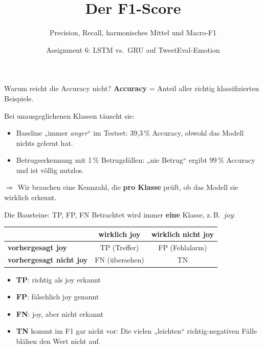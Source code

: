 \documentclass[aspectratio=169,11pt]{beamer}
\title{Der F1-Score}
\subtitle{Precision, Recall, harmonisches Mittel und Macro-F1}
\date{Assignment 6: LSTM vs.\ GRU auf TweetEval-Emotion}
\begin{document}
\maketitle

\begin{frame}{Warum reicht die Accuracy nicht?}
  \textbf{Accuracy} = Anteil aller richtig klassifizierten Beispiele.

  \vspace{1em}
  Bei \alert{unausgeglichenen Klassen} täuscht sie:
  \begin{itemize}
    \item Baseline „immer \emph{anger}“ im Testset: \alert{39{,}3\,\% Accuracy}, obwohl das Modell nichts gelernt hat.
    \item Betrugserkennung mit 1\,\% Betrugsfällen: „nie Betrug“ ergibt \alert{99\,\% Accuracy} und ist völlig nutzlos.
  \end{itemize}

  \vspace{1em}
  \(\Rightarrow\) Wir brauchen eine Kennzahl, die \textbf{pro Klasse} prüft, ob das Modell sie wirklich erkennt.
\end{frame}

\begin{frame}{Die Bausteine: TP, FP, FN}
  Betrachtet wird immer \textbf{eine} Klasse, z.\,B.\ \emph{joy}:

  \vspace{0.8em}
  \begin{center}
  \begin{tabular}{lcc}
    \toprule
     & \textbf{wirklich joy} & \textbf{wirklich nicht joy} \\
    \midrule
    \textbf{vorhergesagt joy}       & TP (Treffer)       & FP (Fehlalarm) \\
    \textbf{vorhergesagt nicht joy} & FN (übersehen)     & TN \\
    \bottomrule
  \end{tabular}
  \end{center}

  \vspace{0.8em}
  \begin{itemize}
    \item \textbf{TP}: richtig als joy erkannt
    \item \textbf{FP}: fälschlich joy genannt
    \item \textbf{FN}: joy, aber nicht erkannt
    \item \textbf{TN} kommt im F1 \alert{gar nicht vor}: Die vielen „leichten“ richtig-negativen Fälle blähen den Wert nicht auf.
  \end{itemize}
\end{frame}
\end{document}
